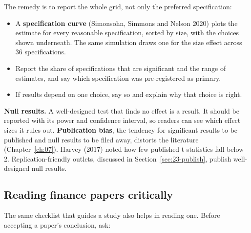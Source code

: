 The remedy is to report the whole grid, not only the preferred specification:

\begin{itemize}
  \item A \textbf{specification curve} (Simonsohn, Simmons and Nelson 2020) plots the estimate for every reasonable specification, sorted by size, with the choices shown underneath. The same simulation draws one for the size effect across 36 specifications.
  \item Report the share of specifications that are significant and the range of estimates, and say which specification was pre-registered as primary.
  \item If results depend on one choice, say so and explain why that choice is right.
\end{itemize}

\textbf{Null results.} A well-designed test that finds no effect is a result. It should be reported with its power and confidence interval, so readers can see which effect sizes it rules out. \textbf{Publication bias}, the tendency for significant results to be published and null results to be filed away, distorts the literature (Chapter~\ref{ch:07}). Harvey (2017) noted how few published t-statistics fall below 2. Replication-friendly outlets, discussed in Section~\ref{sec:23-publish}, publish well-designed null results.

\subsection{Reading finance papers critically}
\label{sec:23-reading}

The same checklist that guides a study also helps in reading one. Before accepting a paper's conclusion, ask:

